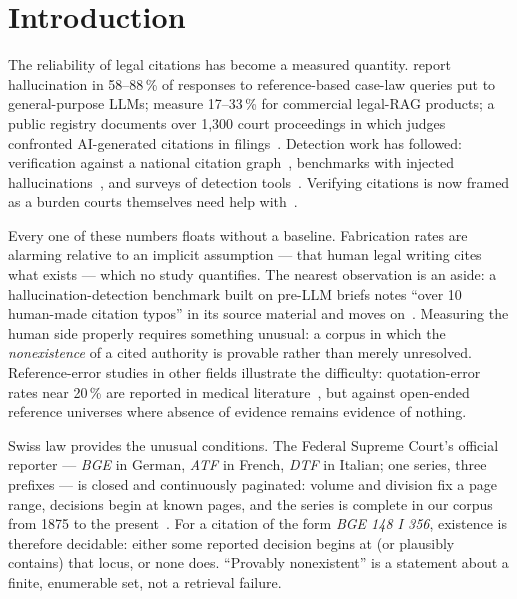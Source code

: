 \documentclass[11pt,a4paper]{article}
\begin{document}
\section{Introduction}\label{sec:intro}

The reliability of legal citations has become a measured quantity.
\citet{dahl2024} report hallucination in 58--88\,\% of responses to
reference-based case-law queries put to general-purpose LLMs;
\citet{magesh2024} measure 17--33\,\% for commercial legal-RAG
products; a public registry
documents over 1{,}300 court proceedings in which judges confronted
AI-generated citations in filings~\cite{charlotin2026}. Detection work
has followed: verification against a national citation
graph~\citep{ovcharov2026ukraine}, benchmarks with injected
hallucinations~\citep{legalcitebench2026}, and surveys of detection
tools~\citep{citetools2026}. Verifying citations is now framed as a
burden courts themselves need help with~\citep{citp2026}.

Every one of these numbers floats without a baseline. Fabrication rates
are alarming relative to an implicit assumption --- that human legal
writing cites what exists --- which no study quantifies. The nearest
observation is an aside: a hallucination-detection benchmark built on
pre-LLM briefs notes ``over 10 human-made citation typos'' in its
source material and moves on~\citep{legalcitebench2026}. Measuring the
human side properly requires something unusual: a corpus in which the
\emph{nonexistence} of a cited authority is provable rather than merely
unresolved. Reference-error studies in other fields illustrate the
difficulty: quotation-error rates near 20\,\% are reported in medical
literature~\citep{quotationerr}, but against open-ended reference
universes where absence of evidence remains evidence of nothing.

Swiss law provides the unusual conditions. The Federal Supreme Court's
official reporter --- \emph{BGE} in German, \emph{ATF} in French,
\emph{DTF} in Italian; one series, three prefixes --- is closed and
continuously paginated: volume and division fix a page range, decisions
begin at known pages, and the series is complete in our corpus from
1875 to the present~\citep{hertner2026opencaselaw}. For a citation of
the form \emph{BGE 148 I 356}, existence is therefore decidable: either
some reported decision begins at (or plausibly contains) that locus, or
none does. ``Provably nonexistent'' is a statement about a finite,
enumerable set, not a retrieval failure.
\end{document}
